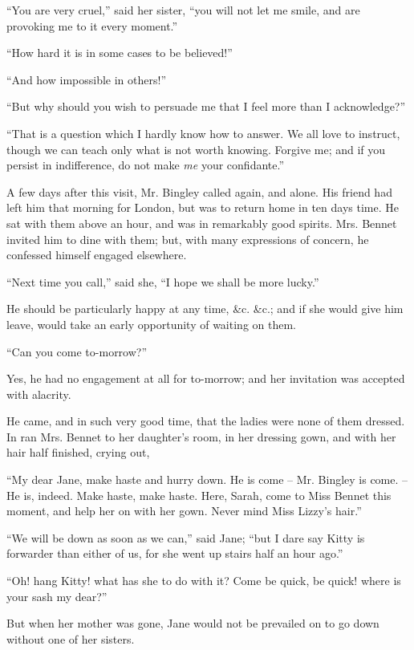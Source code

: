 “You are very cruel,” said her sister, “you will not
let me smile, and are provoking me to it every moment.”

“How hard it is in some cases to be believed!”

“And how impossible in others!”

“But why should you wish to persuade me that I feel
more than I acknowledge?”

“That is a question which I hardly know how to answer.
We all love to instruct, though we can teach only what
is not worth knowing. Forgive me; and if you persist
in indifference, do not make \textit{me} your confidante.”


A few days after this visit, Mr. Bingley called again,
and alone. His friend had left him that morning for
London, but was to return home in ten days time. He
sat with them above an hour, and was in remarkably good
spirits. Mrs. Bennet invited him to dine with them; but,
with many expressions of concern, he confessed himself
engaged elsewhere.

“Next time you call,” said she, “I hope we shall be
more lucky.”

He should be particularly happy at any time, \&c. \&c.;
and if she would give him leave, would take an early
opportunity of waiting on them.

“Can you come to-morrow?”

Yes, he had no engagement at all for to-morrow; and
her invitation was accepted with alacrity.

He came, and in such very good time, that the ladies
were none of them dressed. In ran Mrs. Bennet to her
daughter’s room, in her dressing gown, and with her hair
half finished, crying out,

“My dear Jane, make haste and hurry down. He is
come -- Mr. Bingley is come. -- He is, indeed. Make haste,
make haste. Here, Sarah, come to Miss Bennet this
moment, and help her on with her gown. Never mind
Miss Lizzy’s hair.”

“We will be down as soon as we can,” said Jane;
“but I dare say Kitty is forwarder than either of us, for
she went up stairs half an hour ago.”

“Oh! hang Kitty! what has she to do with it? Come
be quick, be quick! where is your sash my dear?”

But when her mother was gone, Jane would not be
prevailed on to go down without one of her sisters.

